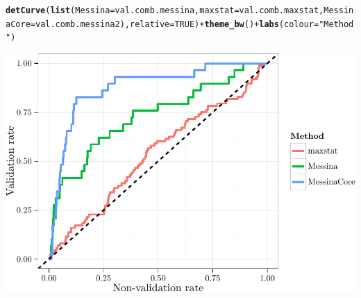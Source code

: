 \documentclass{article}\usepackage[]{graphicx}\usepackage[]{color}
\makeatletter
\def\maxwidth{ %
  \ifdim\Gin@nat@width>\linewidth
    \linewidth
  \else
    \Gin@nat@width
  \fi
}
\newcommand{\hlnum}[1]{\textcolor[rgb]{0.686,0.059,0.569}{#1}}%
\newcommand{\hlstr}[1]{\textcolor[rgb]{0.192,0.494,0.8}{#1}}%
\newcommand{\hlopt}[1]{\textcolor[rgb]{0,0,0}{#1}}%
\newcommand{\hlstd}[1]{\textcolor[rgb]{0.345,0.345,0.345}{#1}}%
\newcommand{\hlkwc}[1]{\textcolor[rgb]{0.333,0.667,0.333}{#1}}%
\newcommand{\hlkwd}[1]{\textcolor[rgb]{0.737,0.353,0.396}{\textbf{#1}}}%
\newenvironment{kframe}{%
 \def\at@end@of@kframe{}%
 \ifinner\ifhmode%
  \def\at@end@of@kframe{\end{minipage}}%
  \begin{minipage}{\columnwidth}%
 \fi\fi%
 \def\FrameCommand##1{\hskip\@totalleftmargin \hskip-\fboxsep
 \colorbox{shadecolor}{##1}\hskip-\fboxsep
     \hskip-\linewidth \hskip-\@totalleftmargin \hskip\columnwidth}%
 \MakeFramed {\advance\hsize-\width
   \@totalleftmargin\z@ \linewidth\hsize
   \@setminipage}}%
 {\par\unskip\endMakeFramed%
 \at@end@of@kframe}
\newenvironment{knitrout}{}{} %
\makeatother
\begin{document}
\begin{knitrout}
{}


\begin{kframe}\begin{alltt}
\hlkwd{detCurve}\hlstd{(}\hlkwd{list}\hlstd{(}\hlkwc{Messina} \hlstd{= val.comb.messina,} \hlkwc{maxstat} \hlstd{= val.comb.maxstat,} \hlkwc{MessinaCore} \hlstd{= val.comb.messina2),} \hlkwc{relative} \hlstd{=} \hlnum{TRUE}\hlstd{)} \hlopt{+} \hlkwd{theme_bw}\hlstd{()} \hlopt{+} \hlkwd{labs}\hlstd{(}\hlkwc{colour} \hlstd{=} \hlstr{"Method"}\hlstd{)}
\end{alltt}
\end{kframe}

{\centering \includegraphics[width=\maxwidth]{figure/07-E3-E3-val-detcurves-8} 

}



\end{knitrout}
\end{document}
